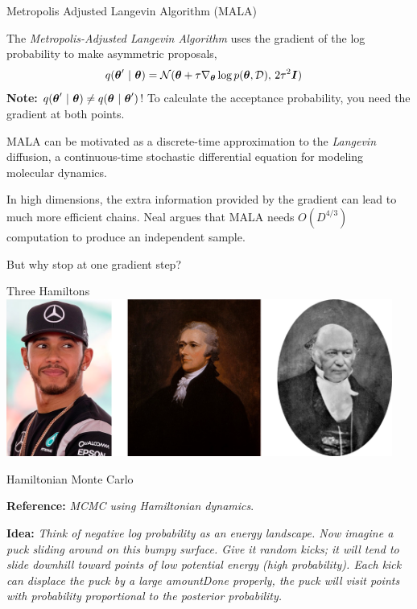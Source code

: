 \documentclass[aspectratio=169]{beamer}
\begin{document}
\begin{frame}{Metropolis Adjusted Langevin Algorithm (MALA)}

The \textit{Metropolis-Adjusted Langevin Algorithm} uses the gradient of the log probability to make asymmetric proposals,
\begin{align}
    q(\boldsymbol{\theta}' ~\vert~ \boldsymbol{\theta}) &= \mathcal{N}(\boldsymbol{\theta} + \tau \nabla_{\boldsymbol{\theta}} \log p(\boldsymbol{\theta}, \mathcal{D}), \, 2\tau^2 \boldsymbol{I}) 
\end{align}
\textbf{Note:} $q(\boldsymbol{\theta}' ~\vert~ \boldsymbol{\theta}) \neq q(\boldsymbol{\theta} ~\vert~ \boldsymbol{\theta}')$! To calculate the acceptance probability, you need the gradient at both points.

MALA can be motivated as a discrete-time approximation to the \textit{Langevin} diffusion, a continuous-time stochastic differential equation for modeling molecular dynamics.

In high dimensions, the extra information provided by the gradient can lead to much more efficient chains. Neal argues that MALA needs $O(D^{4/3})$ computation to produce an independent sample.

But why stop at one gradient step?

\end{frame}


\begin{frame}{Three Hamiltons}
\centering
\includegraphics[width=0.95\textwidth]{figures/lap3/hamiltons.png}
\end{frame}

\begin{frame}{Hamiltonian Monte Carlo}
    
\textbf{Reference:} \citet{Neal2012-ev} \textit{{MCMC} using Hamiltonian dynamics}.

\textbf{Idea: } \textit{Think of negative log probability as an \textit{energy landscape}. Now imagine a puck sliding around on this bumpy surface. Give it random kicks; it will tend to slide downhill toward points of low potential energy (high probability). Each kick can displace the puck by a large amountDone properly, the puck will visit points with probability proportional to the posterior probability. }
    
\end{frame}
\end{document}
